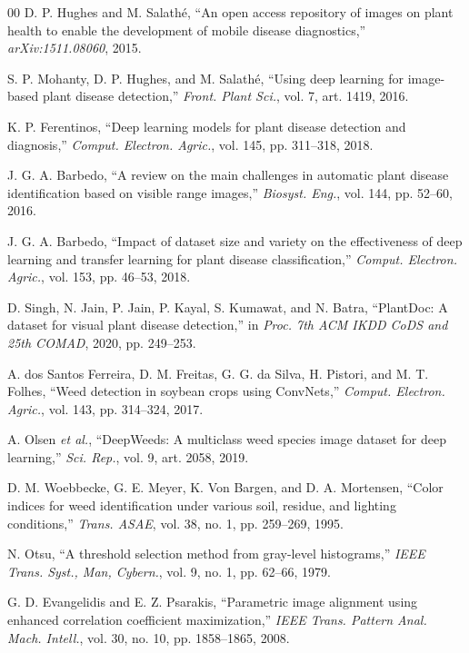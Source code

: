 \documentclass[conference]{IEEEtran}
\begin{document}
\begin{thebibliography}{00}
 D. P. Hughes and M. Salath\'e, ``An open access repository
of images on plant health to enable the development of mobile disease
diagnostics,'' \emph{arXiv:1511.08060}, 2015.

 S. P. Mohanty, D. P. Hughes, and M. Salath\'e, ``Using
deep learning for image-based plant disease detection,'' \emph{Front. Plant
Sci.}, vol. 7, art. 1419, 2016.

 K. P. Ferentinos, ``Deep learning models for plant
disease detection and diagnosis,'' \emph{Comput. Electron. Agric.}, vol. 145,
pp. 311--318, 2018.

 J. G. A. Barbedo, ``A review on the main challenges in
automatic plant disease identification based on visible range images,''
\emph{Biosyst. Eng.}, vol. 144, pp. 52--60, 2016.

 J. G. A. Barbedo, ``Impact of dataset size and variety on
the effectiveness of deep learning and transfer learning for plant disease
classification,'' \emph{Comput. Electron. Agric.}, vol. 153, pp. 46--53, 2018.

 D. Singh, N. Jain, P. Jain, P. Kayal, S. Kumawat, and
N. Batra, ``PlantDoc: A dataset for visual plant disease detection,'' in
\emph{Proc. 7th ACM IKDD CoDS and 25th COMAD}, 2020, pp. 249--253.

 A. dos Santos Ferreira, D. M. Freitas,
G. G. da Silva, H. Pistori, and M. T. Folhes, ``Weed detection in soybean crops
using ConvNets,'' \emph{Comput. Electron. Agric.}, vol. 143, pp. 314--324,
2017.

 A. Olsen \emph{et al.}, ``DeepWeeds: A multiclass weed
species image dataset for deep learning,'' \emph{Sci. Rep.}, vol. 9, art. 2058,
2019.

 D. M. Woebbecke, G. E. Meyer, K. Von Bargen, and
D. A. Mortensen, ``Color indices for weed identification under various soil,
residue, and lighting conditions,'' \emph{Trans. ASAE}, vol. 38, no. 1,
pp. 259--269, 1995.

 N. Otsu, ``A threshold selection method from gray-level
histograms,'' \emph{IEEE Trans. Syst., Man, Cybern.}, vol. 9, no. 1,
pp. 62--66, 1979.

 G. D. Evangelidis and E. Z. Psarakis, ``Parametric
image alignment using enhanced correlation coefficient maximization,''
\emph{IEEE Trans. Pattern Anal. Mach. Intell.}, vol. 30, no. 10,
pp. 1858--1865, 2008.


\end{thebibliography}
\end{document}
